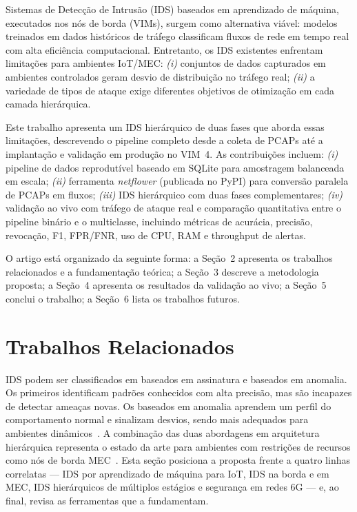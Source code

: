 \documentclass[12pt]{article}
\begin{document}
Sistemas de Detecção de Intrusão (IDS) baseados em aprendizado de máquina,
executados nos nós de borda (VIMs), surgem como alternativa viável: modelos
treinados em dados históricos de tráfego classificam fluxos de rede em tempo
real com alta eficiência computacional. Entretanto, os IDS existentes
enfrentam limitações para ambientes IoT/MEC: \textit{(i)} conjuntos de dados
capturados em ambientes controlados geram desvio de distribuição no tráfego
real; \textit{(ii)} a variedade de tipos de ataque exige diferentes objetivos
de otimização em cada camada hierárquica.

Este trabalho apresenta um IDS hierárquico de duas fases que aborda essas
limitações, descrevendo o pipeline completo desde a coleta de PCAPs até a
implantação e validação em produção no VIM~4. As contribuições incluem:
\textit{(i)} pipeline de dados reprodutível baseado em SQLite para amostragem
balanceada em escala; \textit{(ii)} ferramenta \textit{netflower} (publicada
no PyPI) para conversão paralela de PCAPs em fluxos; \textit{(iii)} IDS
hierárquico com duas fases complementares; \textit{(iv)} validação ao vivo com
tráfego de ataque real e comparação quantitativa entre o pipeline binário e o
multiclasse, incluindo métricas de acurácia, precisão, revocação, F1,
FPR/FNR, uso de CPU, RAM e throughput de alertas.

O artigo está organizado da seguinte forma: a Seção~2 apresenta os trabalhos
relacionados e a fundamentação teórica; a Seção~3 descreve a metodologia
proposta; a Seção~4 apresenta os resultados da validação ao vivo; a Seção~5
conclui o trabalho; a Seção~6 lista os trabalhos futuros.

\section{Trabalhos Relacionados}

IDS podem ser classificados em baseados em assinatura e baseados em anomalia.
Os primeiros identificam padrões conhecidos com alta precisão, mas são
incapazes de detectar ameaças novas. Os baseados em anomalia aprendem um perfil
do comportamento normal e sinalizam desvios, sendo mais adequados para
ambientes dinâmicos~\cite{lazarevic:05}. A combinação das duas abordagens em
arquitetura hierárquica representa o estado da arte para ambientes com
restrições de recursos como nós de borda MEC~\cite{zolanvari:19}. Esta seção
posiciona a proposta frente a quatro linhas correlatas — IDS por aprendizado de
máquina para IoT, IDS na borda e em MEC, IDS hierárquicos de múltiplos estágios
e segurança em redes 6G — e, ao final, revisa as ferramentas que a fundamentam.
\end{document}
